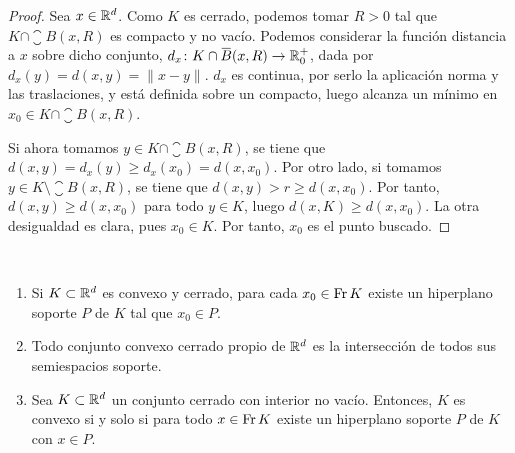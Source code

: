 \documentclass{book}
\begin{document}
\begin{proof}
	Sea $x \in \mathbb{R}^d$. Como $K$ es cerrado, podemos tomar $R > 0$ tal que $K \cap \closure{B}(x,R)$ es compacto y no vacío. Podemos considerar la función distancia a $x$ sobre dicho conjunto, $d_x \colon K \cap \closure{B}(x,R) \to \R^+_0$, dada por $d_x(y) = d(x,y) = \|x-y\|$. $d_x$ es continua, por serlo la aplicación norma y las traslaciones, y está definida sobre un compacto, luego alcanza un mínimo en $x_0 \in K \cap \closure{B}(x,R)$.

	Si ahora tomamos $y \in K\cap\closure{B}(x,R)$, se tiene que $d(x,y) = d_x(y) \ge d_x(x_0) = d(x,x_0)$. Por otro lado, si tomamos $y \in K \setminus \closure{B}(x,R)$, se tiene que $d(x,y) > r \ge d(x,x_0)$. Por tanto, $d(x,y) \ge d(x,x_0)$ para todo $y \in K$, luego $d(x,K) \ge d(x,x_0)$. La otra desigualdad es clara, pues $x_0 \in K$. Por tanto, $x_0$ es el punto buscado.
\end{proof}

\begin{thm}~ \label{thm:support_hyperplane}
	\begin{enumerate}
		\item Si $K \subset \mathbb{R}^d$ es convexo y cerrado, para cada $x_0 \in \operatorname{Fr} K$ existe un hiperplano soporte $P$ de $K$ tal que $x_0 \in P$. \label{item:thm_supp:1}
		\item Todo conjunto convexo cerrado propio de $\mathbb{R}^d$ es la intersección de todos sus semiespacios soporte. \label{item:thm_supp:2}
		\item Sea $K \subset \mathbb{R}^d$ un conjunto cerrado con interior no vacío. Entonces, $K$ es convexo si y solo si para todo $x \in \operatorname{Fr} K$ existe un hiperplano soporte $P$ de $K$ con $x \in P$. \label{item:thm_supp:3}
	\end{enumerate}
\end{thm}
\end{document}
